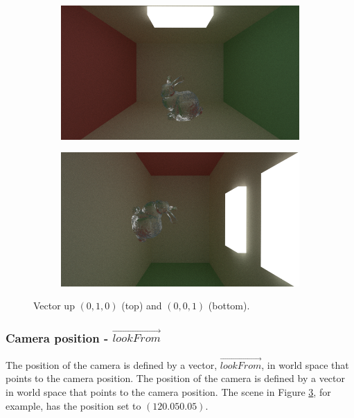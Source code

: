 \documentclass[titlepage,12pt]{report}
\begin{document}
\begin{figure}[H]
	\centering
	\medskip
	\begin{subfigure}{.48\textwidth}
		\centering
		\includegraphics[scale=0.35]{media/cornell_bunny.png}
		\label{cameraupy}
	\end{subfigure}
	\begin{subfigure}{.48\textwidth}
		\centering
		\includegraphics[scale=0.35]{media/cornell_bunny_z_1.png}
		\label{cameraupz}
	\end{subfigure}
	
	\caption{Vector up $(0,1,0)$ (top) and $(0,0,1)$ (bottom).}
	\label{cameraup}
\end{figure}

\subsubsection{Camera position - $\vec{lookFrom}$}

The position of the camera is defined by a vector, $\vec{lookFrom}$, in world space that points to the camera position. The position of the camera is defined by a vector in world space that points to the camera position. The scene in Figure \ref{cameraup}, for example, has the position set to $(12 0.05 0.05)$.
\end{document}
